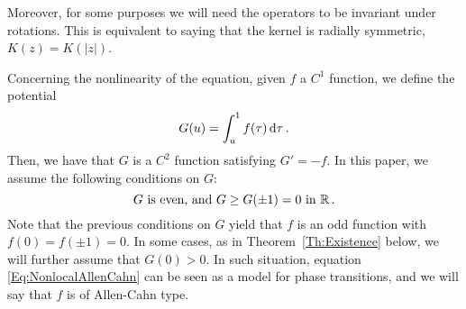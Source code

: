 Moreover, for some purposes we will need the operators to be invariant under rotations. This is equivalent to saying that the kernel is radially symmetric, $K(z) = K(|z|)$. 

Concerning the nonlinearity of the equation, given $f$ a $C^1$ function, we define the potential
$$
G(u)= \int_u^1 f(\tau) \,\mathrm{d} \tau\,.
$$
Then, we have that $G$ is a $C^2$ function satisfying $G' = -f$. In this paper, we assume the following conditions on $G$:
\begin{equation}
\label{Eq:HipothesesG}
G \textrm{ is even, and } G\geq G(\pm 1 )=0 \textrm{ in } \mathbb{R}\,.
\end{equation}
Note that the previous conditions on $G$ yield that $f$ is an odd function with $f(0)=f(\pm 1)=0$. In some cases, as in Theorem~\ref{Th:Existence} below, we will further assume that $G(0)>0$. In such situation, equation \eqref{Eq:NonlocalAllenCahn} can be seen as a model for phase transitions, and we will say that $f$ is of Allen-Cahn type. 




